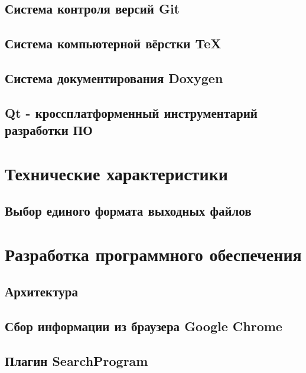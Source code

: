 \subsection{Система контроля версий Git}

\subsection{Система компьютерной вёрстки \TeX}

\subsection{Система документирования Doxygen}

\subsection{Qt - кроссплатформенный инструментарий разработки ПО}


\section{Технические характеристики}

\subsection{Выбор единого формата выходных файлов}


\section{Разработка программного обеспечения}
\setcounter{figure}{0}
 
\subsection{Архитектура}


\newpage
\subsection{Сбор информации из браузера Google Chrome} %


\newpage
\subsection{Плагин SearchProgram} %


